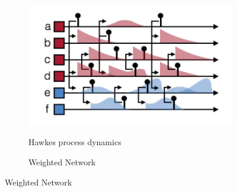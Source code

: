 \begin{figure}[t]
  \begin{center}
    \begin{subfigure}[b]{2.34in}
      \caption{Hawkes process dynamics}
      \centering
      \includegraphics[width=\textwidth]{figures/ch2b/figure1a.pdf} 
      \label{fig:hawkes_a}
    \end{subfigure}
    \begin{subfigure}[b]{0.81in}
      \caption{Weighted Network}
      \centering

\end{subfigure}
\end{center}
\end{figure}

